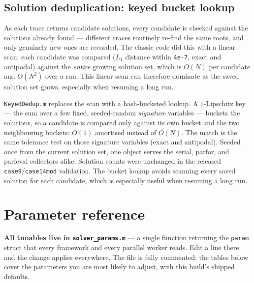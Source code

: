 \documentclass[11pt,a4paper]{article}
\newcommand{\code}[1]{\texttt{#1}}
\begin{document}
\subsection{Solution deduplication: keyed bucket lookup}\label{sec:dedup}
As each trace returns candidate solutions, every candidate is checked against the solutions
already found --- different traces routinely re-find the same roots, and only genuinely new
ones are recorded. The classic code did this with a linear scan: each candidate was compared
($L_1$ distance within \code{4e-7}, exact and antipodal) against the \emph{entire} growing
solution set, which is $O(N)$ per candidate and $O(N^2)$ over a run. This linear scan can
therefore dominate as the saved solution set grows, especially when resuming a long run.

\code{KeyedDedup.m} replaces the scan with a hash-bucketed lookup. A $1$-Lipschitz key --- the
sum over a few fixed, seeded-random \emph{signature} variables --- buckets the solutions, so a
candidate is compared only against its own bucket and the two neighbouring buckets: $O(1)$
amortised instead of $O(N)$. The match is the same tolerance test on those signature
variables (exact and antipodal). Seeded once from the current solution set, one object serves
the serial, parfor, and parfeval collectors alike. Solution counts were unchanged in the
released \code{case9}/\code{case14mod} validation. The bucket lookup avoids scanning every
saved solution for each candidate, which is especially useful when resuming a long run.

\section{Parameter reference}\label{sec:params}

\textbf{All tunables live in \code{solver_params.m}} --- a single function returning the
\code{param} struct that every framework and every parallel worker reads. Edit a line
there and the change applies everywhere. The file is fully commented; the tables below
cover the parameters you are most likely to adjust, with this build's shipped defaults.
\end{document}
